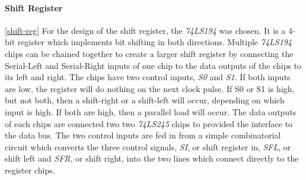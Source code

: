 \paragraph{Shift Register} \ref{shift-reg}
For the design of the shift register, the \emph{74LS194} \cite{74ls194} was chosen. It is a 4-bit register which implements
bit shifting in both directions. Multiple \emph{74LS194} chips can be chained together to create a larger shift register by
connecting the Serial-Left and Serial-Right inputs of one chip to the data outputs of the chips to its left and right.
The chips have two control inputs, \emph{S0} and \emph{S1}. If both inputs are low, the register will do nothing on the next clock
pulse. If S0 or S1 is high, but not both, then a shift-right or a shift-left will occur, depending on which input is high.
If both are high, then a parallel load will occur. The data outputs of each chips are connected two two \emph{74LS245}
\cite{74ls245} chips to provided the interface to the data bus. The two control inputs are fed in from a simple combinatorial
circuit which converts the three control signals, \emph{SI}, or shift register in, \emph{SFL}, or shift left and \emph{SFR}, or
shift right, into the two lines which connect directly to the register chips.



